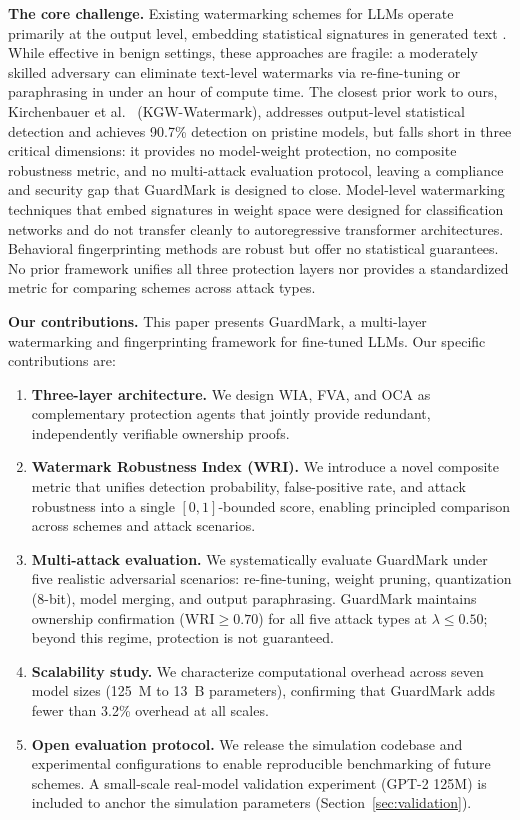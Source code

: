 \documentclass[journal,compsoc]{IEEEtran}
\newcommand{\WRI}{\mathrm{WRI}}
\begin{document}
\textbf{The core challenge.} Existing watermarking schemes for LLMs operate
primarily at the output level, embedding statistical signatures in generated
text \cite{kirchenbauer2023watermark,zhao2023protecting,fernandez2023three}.
While effective in benign settings, these approaches are fragile: a moderately
skilled adversary can eliminate text-level watermarks via re-fine-tuning or
paraphrasing in under an hour of compute time. The closest prior work to ours,
Kirchenbauer et al.~\cite{kirchenbauer2023watermark} (KGW-Watermark), addresses
output-level statistical detection and achieves 90.7\% detection on pristine
models, but falls short in three critical dimensions: it provides no model-weight
protection, no composite robustness metric, and no multi-attack evaluation
protocol, leaving a compliance and security gap that GuardMark is designed to
close. Model-level watermarking techniques that embed signatures in weight space
\cite{uchida2017embedding,zhang2018protecting} were designed for
classification networks and do not transfer cleanly to autoregressive
transformer architectures. Behavioral fingerprinting methods
\cite{cao2021ipguard,szyller2021dawn} are robust but offer no statistical
guarantees. No prior framework unifies all three protection layers nor provides
a standardized metric for comparing schemes across attack types.

\textbf{Our contributions.} This paper presents GuardMark, a multi-layer
watermarking and fingerprinting framework for fine-tuned LLMs. Our specific
contributions are:

\begin{enumerate}
  \item \textbf{Three-layer architecture.} We design WIA, FVA, and OCA as
    complementary protection agents that jointly provide redundant,
    independently verifiable ownership proofs.
  \item \textbf{Watermark Robustness Index (WRI).} We introduce a novel
    composite metric that unifies detection probability, false-positive rate,
    and attack robustness into a single $[0,1]$-bounded score, enabling
    principled comparison across schemes and attack scenarios.
  \item \textbf{Multi-attack evaluation.} We systematically evaluate
    GuardMark under five realistic adversarial scenarios: re-fine-tuning,
    weight pruning, quantization (8-bit), model merging, and output
    paraphrasing. GuardMark maintains ownership confirmation ($\WRI \geq 0.70$)
    for all five attack types at $\lambda \leq 0.50$; beyond this regime,
    protection is not guaranteed.
  \item \textbf{Scalability study.} We characterize computational overhead
    across seven model sizes (125~M to 13~B parameters), confirming that
    GuardMark adds fewer than 3.2\% overhead at all scales.
  \item \textbf{Open evaluation protocol.} We release the simulation
    codebase and experimental configurations to enable reproducible
    benchmarking of future schemes. A small-scale real-model validation
    experiment (GPT-2 125M) is included to anchor the simulation parameters
    (Section~\ref{sec:validation}).
\end{enumerate}
\end{document}
